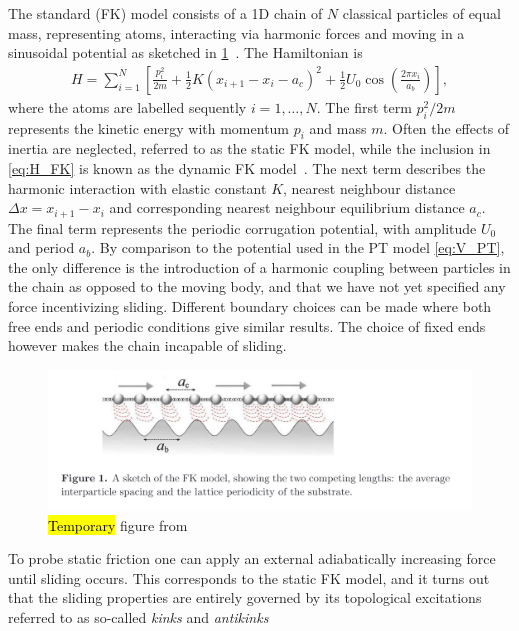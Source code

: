 The standard (\acrshort{FK}) model consists of a 1D chain of $N$ classical particles of equal mass, representing atoms, interacting via harmonic forces and moving in a sinusoidal potential as sketched in \cref{fig:FK_model}~\cite{Manini_2016}. The Hamiltonian is 
\begin{align}
  H = \sum_{i=1}^N \left[\frac{p_i^2}{2m} + \frac{1}{2}K(x_{i+1} - x_i - a_c)^2 + \frac{1}{2}U_0 \cos{\left(\frac{2\pi x_i}{a_b}\right)}\right],
  \label{eq:H_FK}
\end{align}
where the atoms are labelled sequently $i = 1, \hdots, N$. The first term $p_i^2/2m$ represents the kinetic energy with momentum $p_i$
and mass $m$. Often the effects of inertia are neglected, referred to as the static \acrshort{FK} model, while the inclusion in \cref{eq:H_FK} is known as the dynamic \acrshort{FK} model~\cite{FK2D}. The next term describes the harmonic interaction with elastic
constant $K$, nearest neighbour distance $\Delta x = x_{i+1} - x_i$ and 
corresponding nearest neighbour equilibrium distance $a_c$. The final term represents the periodic corrugation potential, with amplitude $U_0$ and period $a_b$. By comparison to the potential used in the \acrshort{PT} model \cref{eq:V_PT}, the only difference is the introduction of a harmonic coupling between particles in the chain as opposed to the moving body, and that we have not yet specified any force incentivizing sliding. Different boundary choices can be made where both free ends and periodic conditions give similar results. The choice of fixed ends however makes the chain incapable of sliding.

\begin{figure}[H]
  \centering
  \includegraphics[width=0.8\linewidth]{figures/theory/FK_model.png}
  \caption{\hl{Temporary} figure from~\cite{Manini_2016}}
  \label{fig:FK_model}
\end{figure}

To probe static friction one can apply an external adiabatically increasing force until sliding occurs. This corresponds to the static \acrshort{FK} model, and it turns out that the sliding properties are entirely governed by its topological excitations referred to as so-called \textit{kinks} and \textit{antikinks}

